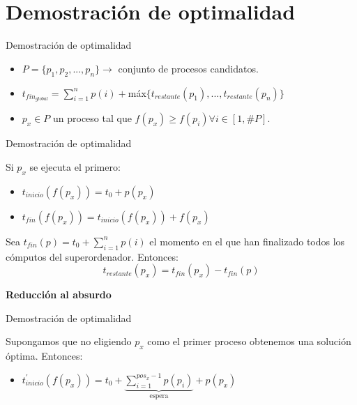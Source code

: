 \documentclass{beamer}
\begin{document}
\section{Demostración de optimalidad}

\begin{frame}[fragile]{Demostración de optimalidad}

\begin{itemize}
	\item $P=\{p_1,p_2,...,p_n\} \rightarrow $ conjunto de procesos candidatos.
	\item $t_{fin_{global}} = \sum_{i=1}^{n} p(i) + $máx$\{t_{restante}(p_1),...,t_{restante}(p_n)\}$
	\item $p_x \in P$ un proceso tal que $f(p_x)\geq f(p_i) \forall i \in [1,\#P]$.
\end{itemize}

\end{frame}

\begin{frame}[fragile]{Demostración de optimalidad}

Si $p_x$ se ejecuta el primero:
\begin{itemize}
	\item $t_{inicio}(f(p_x))= t_0 + p(p_x)$
	\item $t_{fin}(f(p_x))= t_{inicio}(f(p_x)) + f(p_x)$
\end{itemize}

\vspace{0.2cm}

Sea $t_{fin}(p)=t_0 + \sum^{n}_{i=1}p(i)$ el momento en el que han finalizado todos los cómputos del superordenador. Entonces:
\begin{equation*}
	t_{restante}(p_x)=t_{fin}(p_x) - t_{fin}(p)
\end{equation*}
\begin{center}
\textbf{Reducción al absurdo}
\end{center}
\end{frame}

\begin{frame}[fragile]{Demostración de optimalidad}

Supongamos que no eligiendo $p_x$ como el primer proceso obtenemos una solución óptima. Entonces:
\begin{itemize}
\item $t_{inicio}^{\prime}(f(p_x))= t_0 + 
\underbrace{\sum^{pos_x-1}_{i=1} p(p_i)}_{\text{espera}} + p(p_x) $
\end{itemize}
\end{frame}
\end{document}
